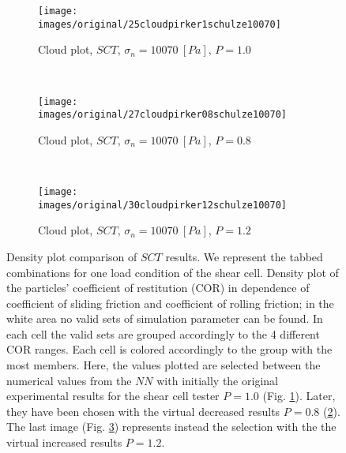 \begin{figure}[htp] \centering
    \begin{subfigure}[b]{0.96\columnwidth}
        \texttt{[image: images/original/25cloudpirker1schulze10070]}
        \caption{Cloud plot, $SCT$, $\sigma_n=10070 ~[Pa]$, $P=1.0$}
        \label{fig:25cloudpirker1schulze10070}
    \end{subfigure}\\
    \begin{subfigure}[b]{0.96\columnwidth}
        \texttt{[image: images/original/27cloudpirker08schulze10070]}
        \caption{Cloud plot, $SCT$, $\sigma_n=10070 ~[Pa]$, $P=0.8$}
        \label{fig:27cloudpirker08schulze10070} 
    \end{subfigure}\\
    \begin{subfigure}[b]{0.96\columnwidth}
        \texttt{[image: images/original/30cloudpirker12schulze10070]}
        \caption{Cloud plot, $SCT$, $\sigma_n=10070 ~[Pa]$, $P=1.2$}
        \label{fig:30cloudpirker12schulze10070} 
    \end{subfigure}
    \caption[Density plot comparison of SCT results]{Density plot comparison of
    $SCT$ results. We represent the tabbed combinations for one load condition
    of the shear cell. 
    Density plot of the particles' coefficient of restitution (COR) in dependence
	of coefficient of sliding friction and coefficient of rolling friction; in the
	white area no valid sets of simulation parameter can be found.
	In each cell the valid sets are grouped accordingly to the 4 different COR
	ranges.
	Each cell is colored accordingly to the group with the most members. 
    Here, the values plotted are selected between the numerical
    values from the $NN$ with initially the original experimental results for the shear cell tester $P=1.0$ (Fig.
    \ref{fig:25cloudpirker1schulze10070}). 
        Later, they have been chosen with  
    the virtual decreased results $P=0.8$
    (\ref{fig:27cloudpirker08schulze10070}).
    The last image (Fig. \ref{fig:30cloudpirker12schulze10070}) represents
    instead the selection with the the virtual increased results $P=1.2$.    }
    \label{fig:29schulzeradarandcloud}
\end{figure}
